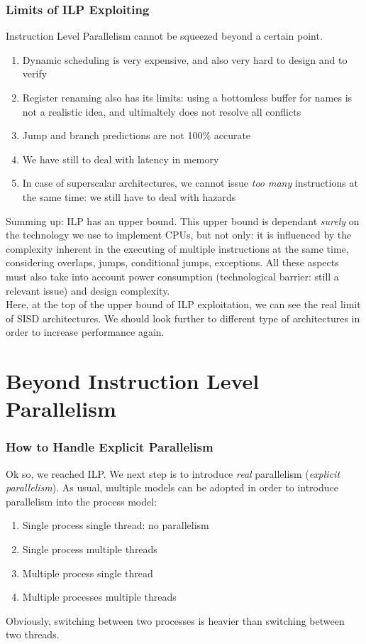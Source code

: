 \documentclass[10pt,a4paper]{article}
\begin{document}
		\section{Limits of ILP Exploiting}
			Instruction Level Parallelism cannot be squeezed beyond a certain point.
			\begin{enumerate}
				\item Dynamic scheduling is very expensive, and also very hard to design and to verify
				\item Register renaming also has its limits: using a bottomless buffer for names is not a realistic idea, and ultimaltely does not resolve all conflicts
				\item Jump and branch predictions are not 100\% accurate
				\item We have still to deal with latency in memory
				\item In case of superscalar architectures, we cannot issue \emph{too many} instructions at the same time: we still have to deal with hazards
			\end{enumerate}
			Summing up: ILP has an upper bound. This upper bound is dependant \emph{surely} on the technology we use to implement CPUs, but not only: it is influenced by the complexity inherent in the executing of multiple instructions at the same time, considering overlaps, jumps, conditional jumps, exceptions. All these aspects must also take into account power consumption (technological barrier: still a relevant issue) and design complexity.\\
			Here, at the top of the upper bound of ILP exploitation, we can see the real limit of SISD architectures. We should look further to different type of architectures in order to increase performance again.
			
	\clearpage \part{Beyond Instruction Level Parallelism}
		\section{How to Handle Explicit Parallelism}
			Ok so, we reached ILP. We next step is to introduce \emph{real} parallelism (\emph{explicit parallelism}). As usual, multiple models can be adopted in order to introduce parallelism into the process model:
			\begin{enumerate}
				\item Single process single thread: no parallelism
				\item Single process multiple threads
				\item Multiple process single thread
				\item Multiple processes multiple threads
			\end{enumerate}
			Obviously, switching between two processes is heavier than switching between two threads. 
			
\end{document}
